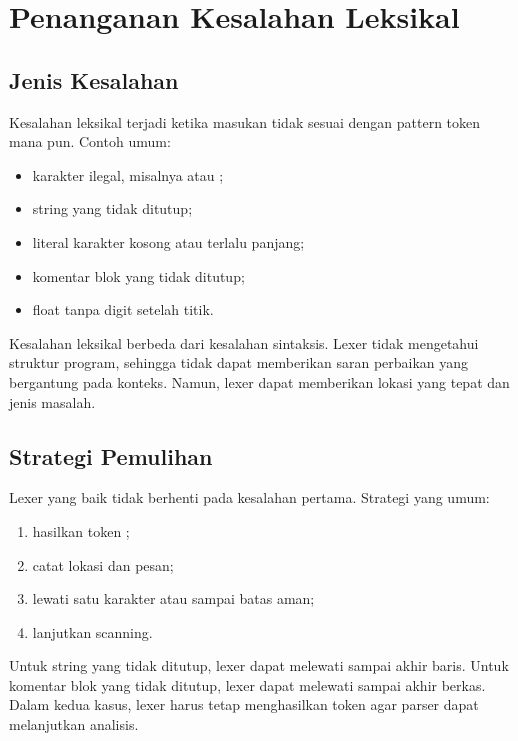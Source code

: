 \section{Penanganan Kesalahan Leksikal}
\label{sec:ch07-error}

\subsection{Jenis Kesalahan}

Kesalahan leksikal terjadi ketika masukan tidak sesuai dengan pattern
token mana pun. Contoh umum:
\begin{itemize}[leftmargin=*]
  \item karakter ilegal, misalnya  atau \code{\#};
  \item string yang tidak ditutup;
  \item literal karakter kosong atau terlalu panjang;
  \item komentar blok yang tidak ditutup;
  \item float tanpa digit setelah titik.
\end{itemize}

Kesalahan leksikal berbeda dari kesalahan sintaksis. Lexer tidak
mengetahui struktur program, sehingga tidak dapat memberikan saran
perbaikan yang bergantung pada konteks. Namun, lexer dapat
memberikan lokasi yang tepat dan jenis masalah.

\subsection{Strategi Pemulihan}

Lexer yang baik tidak berhenti pada kesalahan pertama. Strategi yang
umum:
\begin{enumerate}[label=\arabic*.,leftmargin=*]
  \item hasilkan token ;
  \item catat lokasi dan pesan;
  \item lewati satu karakter atau sampai batas aman;
  \item lanjutkan scanning.
\end{enumerate}

Untuk string yang tidak ditutup, lexer dapat melewati sampai akhir
baris. Untuk komentar blok yang tidak ditutup, lexer dapat melewati
sampai akhir berkas. Dalam kedua kasus, lexer harus tetap
menghasilkan token agar parser dapat melanjutkan analisis.

